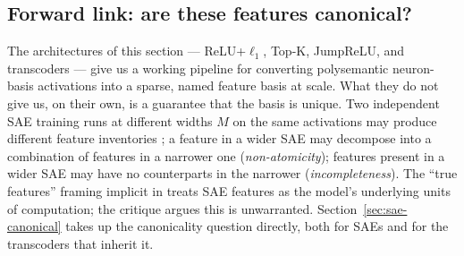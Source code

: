 \subsection{Forward link: are these features canonical?}
\label{sec:sae-forward}

The architectures of this section --- ReLU+$\ell_1$, Top-K, JumpReLU,
and transcoders --- give us a working pipeline for converting
polysemantic neuron-basis activations into a sparse, named feature
basis at scale. What they do not give us, on their own, is a guarantee
that the basis is unique. Two independent SAE training runs at
different widths $M$ on the same activations may produce different
feature inventories \citep{leask2025-sae-not-canonical}; a feature in
a wider SAE may decompose into a combination of features in a narrower
one (\emph{non-atomicity}); features present in a wider SAE may have no
counterparts in the narrower (\emph{incompleteness}). The
``true features'' framing implicit in
\citet{templeton2024-scaling-monosemanticity} treats SAE features as
the model's underlying units of computation; the
\citet{leask2025-sae-not-canonical} critique argues this is unwarranted.
Section~\ref{sec:sae-canonical} takes up the canonicality question
directly, both for SAEs and for the transcoders that inherit it.
